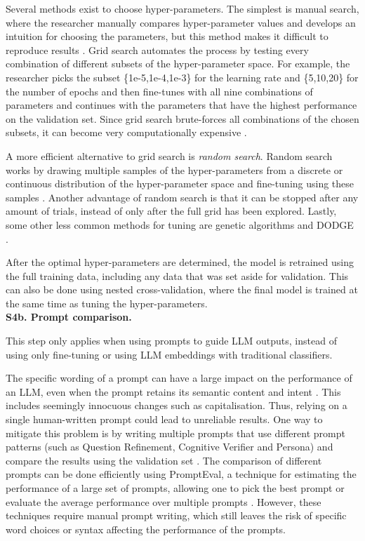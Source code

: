 \documentclass[a4paper]{article}
\newcommand{\infobox}[2]{
	\begin{tcolorbox}[
		skin=widget,
		boxrule=1mm,
		coltitle=black,
		colframe=darkishgray,
		colback=lightergray,
		width=(\linewidth),
		before=\hfill,
		after=\hfill,
		before skip=1pt,
		adjusted title={#1}
		]
		#2
	\end{tcolorbox}
}
\begin{document}
Several methods exist to choose hyper-parameters. The simplest is manual search, where the researcher manually compares hyper-parameter values and develops an intuition for choosing the parameters, but this method makes it difficult to reproduce results \cite{bergstra2012hyperRandomSearch}. Grid search automates the process by testing every combination of different subsets of the hyper-parameter space. For example, the researcher picks the subset \{1e-5,1e-4,1e-3\} for the learning rate and \{5,10,20\} for the number of epochs and then fine-tunes with all nine combinations of parameters and continues with the parameters that have the highest performance on the validation set. Since grid search brute-forces all combinations of the chosen subsets, it can become very computationally expensive \cite{liashchynskyi2019hyperGridsearch}. 

A more efficient alternative to grid search is \textit{random search}. Random search works by drawing multiple samples of the hyper-parameters from a discrete or continuous distribution of the hyper-parameter space and fine-tuning using these samples \cite{bergstra2012hyperRandomSearch}. Another advantage of random search is that it can be stopped after any amount of trials, instead of only after the full grid has been explored. Lastly, some other less common methods for tuning are genetic algorithms \cite{Loussaief2018} and DODGE \cite{agrawal2022hyper}.

After the optimal hyper-parameters are determined, the model is retrained using the full training data, including any data that was set aside for validation. This can also be done using nested cross-validation, where the final model is trained at the same time as tuning the hyper-parameters.\\

\textbf{S4b. Prompt comparison.}\\
\infobox{Optional}{This step only applies when using prompts to guide LLM outputs, instead of using only fine-tuning or using LLM embeddings with traditional classifiers.}
The specific wording of a prompt can have a large impact on the performance of an LLM, even when the prompt retains its semantic content and intent \cite{sclar2024quantifyinglanguagemodelssensitivity, he2024doespromptformattingimpact,mizrahi2024stateartmultipromptllm}. This includes seemingly innocuous changes such as capitalisation. Thus, relying on a single human-written prompt could lead to unreliable results. One way to mitigate this problem is by writing multiple prompts that use different prompt patterns (such as Question Refinement, Cognitive Verifier and Persona) and compare the results using the validation set \cite{ronanki2023}. The comparison of different prompts can be done efficiently using PromptEval, a technique for estimating the performance of a large set of prompts, allowing one to pick the best prompt or evaluate the average performance over multiple prompts \cite{polo2024multiprompt}. However, these techniques require manual prompt writing, which still leaves the risk of specific word choices or syntax affecting the performance of the prompts. 
\end{document}
